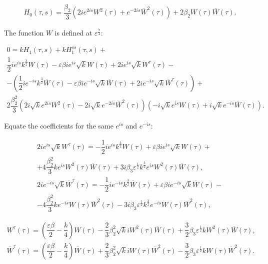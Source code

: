\documentclass[12pt]{article} %
\newcommand{\eps}{\varepsilon}
\begin{document}
\begin{equation*}
\begin{array}{c}
H_0(\tau,s)=
\dfrac{\beta_2}{3}(2ie^{2is}W^2(\tau)+e^{-2is}\overline{W}^2(\tau))+2\beta_2W(\tau)\overline{W}(\tau).
\end{array}
\end{equation*}

The function $W$ is defined at $\eps^{\frac{7}{4}}$:


\begin{equation*}
\begin{array}{c}
0=kH_1(\tau,s)+kH_1^{ss}(\tau,s)+\\
\dfrac{1}{2}ie^{is}k^{\frac{3}{2}}W(\tau)-\eps\beta ie^{is}\sqrt{k}W(\tau)+2ie^{is}\sqrt{k}W^{\tau}(\tau)-\\
-(\dfrac{1}{2}ie^{-is}k^{\frac{3}{2}}\overline{W}(\tau)-\eps\beta ie^{-is}\sqrt{k}\overline{W}(\tau)+2ie^{-is}\sqrt{k}\overline{W}^{\tau}(\tau))+\\
2\dfrac{\beta_2^2}{3}(2i\sqrt{k}e^{2is}W^2(\tau)-2i\sqrt{k}e^{-2is}\overline{W}^2(\tau))(-i\sqrt{k}e^{is}W(\tau)+i\sqrt{k}e^{-is}\overline{W}(\tau)).
\end{array}
\end{equation*}

Equate the coefficients for the same $e^{is}$ and $e^{-is}$:

\begin{equation*}
\begin{array}{c}
2ie^{is}\sqrt{k}W^{\tau}(\tau)=-\dfrac{1}{2}ie^{is}k^{\frac{3}{2}}W(\tau)+\eps\beta ie^{is}\sqrt{k}W(\tau)+\\
+4\dfrac{\beta_2^2}{3}ke^{is}W^2(\tau)\overline{W}(\tau)+3i\beta_3\eps^{\frac{1}{2}}k^{\frac{3}{2}}e^{is}W^2(\tau)\overline{W}(\tau),\\
2ie^{-is}\sqrt{k}\overline{W}^{\tau}(\tau)=-\dfrac{1}{2}ie^{-is}k^{\frac{3}{2}}\overline{W}(\tau)+\eps\beta ie^{-is}\sqrt{k}\overline{W}(\tau)-\\
-4\dfrac{\beta_2^2}{3}ke^{-is}W(\tau)\overline{W}^2(\tau)-3i\beta_3\eps^{\frac{1}{2}}k^{\frac{3}{2}}e^{-is}W(\tau)\overline{W}^2(\tau),
\end{array}
\end{equation*}


\begin{equation}
\begin{array}{c}
W^\tau(\tau)=(\dfrac{\eps\beta}{2}-\dfrac{k}{4})W(\tau)-\dfrac{2}{3}\beta_2^2\sqrt{k}iW^2(\tau)\overline{W}(\tau)+\dfrac{3}{2}\beta_3\eps^{\frac{1}{2}}kW^2(\tau)\overline{W}(\tau),\\
\overline{W}^\tau(\tau)=(\dfrac{\eps\beta}{2}-\dfrac{k}{4})\overline{W}(\tau)+ \dfrac{2}{3}\beta_2^2\sqrt{k}iW(\tau)\overline{W}^2(\tau)-\dfrac{3}{2}\beta_3\eps^{\frac{1}{2}}kW(\tau)\overline{W}^2(\tau).
\end{array}
\label{f:y22}
\end{equation}
\end{document}
